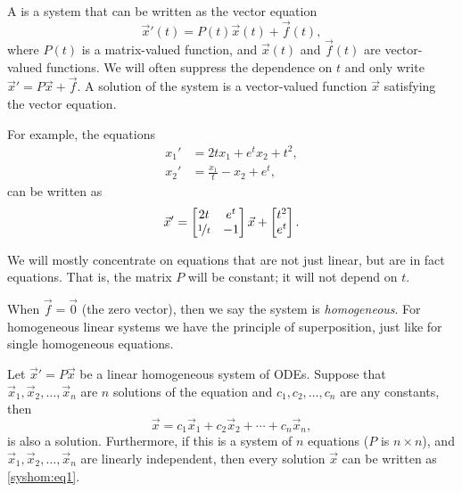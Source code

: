 A \emph{} is a system that can be
written as the vector equation
\begin{equation*}
{\vec{x}}'(t) = P(t)\vec{x}(t) + \vec{f}(t),
\end{equation*}
where $P(t)$ is a matrix-valued function,
and $\vec{x}(t)$ and $\vec{f}(t)$ are vector-valued functions.
We will often suppress the dependence on $t$ and
only write ${\vec{x}}' = P\vec{x} + \vec{f}$.  A solution of
the system is a vector-valued function
$\vec{x}$ satisfying the vector equation.

For example, the equations
\begin{equation*}
\begin{aligned}
x_1' &= 2t x_1 + e^t x_2 + t^2 , \\
x_2' &= \frac{x_1}{t} -x_2 + e^t ,
\end{aligned}
\end{equation*}
can be written as
\begin{equation*}
{\vec{x}}' = 
\begin{bmatrix}
2t & e^t \\
\nicefrac{1}{t} & -1
\end{bmatrix}
\vec{x}
+
\begin{bmatrix}
t^2 \\
e^t
\end{bmatrix} .
\end{equation*}

We will mostly concentrate on equations that are not just linear, but are in
fact \emph{} equations.  That is, the matrix $P$ will
be constant; it will not depend on $t$.

\medskip

When $\vec{f} = \vec{0}$ (the zero vector), then we say the system is
\emph{homogeneous}.
For homogeneous linear systems we have the
principle of superposition, just like for single homogeneous equations.

\begin{theorem}[Superposition]
Let
${\vec{x}}' = P\vec{x}$ be a linear homogeneous system of ODEs.  Suppose
that $\vec{x}_1,\vec{x}_2,\ldots,\vec{x}_n$ are $n$ solutions of the equation
and $c_1,c_2,\ldots,c_n$ are any constants, then
\begin{equation} \label{syshom:eq1}
\vec{x} = c_1 \vec{x}_1 + c_2 \vec{x}_2 + \cdots + c_n \vec{x}_n ,
\end{equation}
is also a solution.
Furthermore, if this is a system of $n$ equations ($P$ is $n\times n$), and
$\vec{x}_1,\vec{x}_2,\ldots,\vec{x}_n$ are linearly independent, then every
solution  $\vec{x}$ can be written as \eqref{syshom:eq1}.
\end{theorem}

